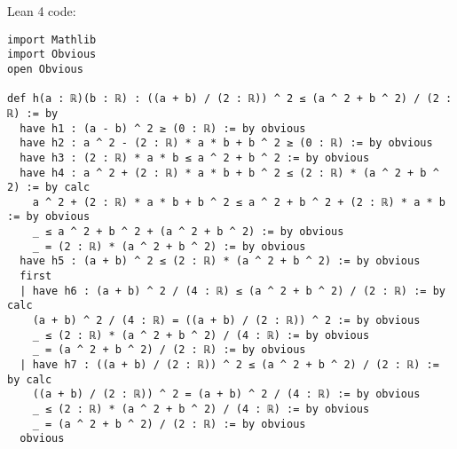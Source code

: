 \documentclass{article}
\begin{document}
Lean 4 code:
\begin{tcolorbox}[colback=white!10, width=\linewidth]
\begin{lstlisting}[language=Lean4]
import Mathlib
import Obvious
open Obvious

def h(a : ℝ)(b : ℝ) : ((a + b) / (2 : ℝ)) ^ 2 ≤ (a ^ 2 + b ^ 2) / (2 : ℝ) := by
  have h1 : (a - b) ^ 2 ≥ (0 : ℝ) := by obvious
  have h2 : a ^ 2 - (2 : ℝ) * a * b + b ^ 2 ≥ (0 : ℝ) := by obvious
  have h3 : (2 : ℝ) * a * b ≤ a ^ 2 + b ^ 2 := by obvious
  have h4 : a ^ 2 + (2 : ℝ) * a * b + b ^ 2 ≤ (2 : ℝ) * (a ^ 2 + b ^ 2) := by calc
    a ^ 2 + (2 : ℝ) * a * b + b ^ 2 ≤ a ^ 2 + b ^ 2 + (2 : ℝ) * a * b := by obvious
    _ ≤ a ^ 2 + b ^ 2 + (a ^ 2 + b ^ 2) := by obvious
    _ = (2 : ℝ) * (a ^ 2 + b ^ 2) := by obvious
  have h5 : (a + b) ^ 2 ≤ (2 : ℝ) * (a ^ 2 + b ^ 2) := by obvious
  first
  | have h6 : (a + b) ^ 2 / (4 : ℝ) ≤ (a ^ 2 + b ^ 2) / (2 : ℝ) := by calc
    (a + b) ^ 2 / (4 : ℝ) = ((a + b) / (2 : ℝ)) ^ 2 := by obvious
    _ ≤ (2 : ℝ) * (a ^ 2 + b ^ 2) / (4 : ℝ) := by obvious
    _ = (a ^ 2 + b ^ 2) / (2 : ℝ) := by obvious
  | have h7 : ((a + b) / (2 : ℝ)) ^ 2 ≤ (a ^ 2 + b ^ 2) / (2 : ℝ) := by calc
    ((a + b) / (2 : ℝ)) ^ 2 = (a + b) ^ 2 / (4 : ℝ) := by obvious
    _ ≤ (2 : ℝ) * (a ^ 2 + b ^ 2) / (4 : ℝ) := by obvious
    _ = (a ^ 2 + b ^ 2) / (2 : ℝ) := by obvious
  obvious

\end{lstlisting}
\end{tcolorbox}
\end{document}
